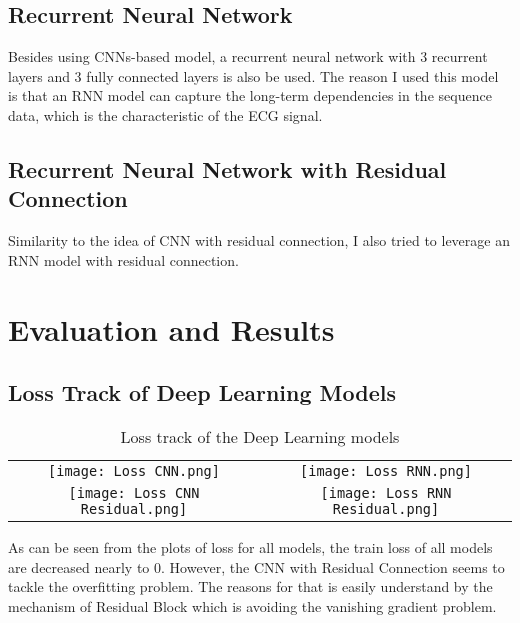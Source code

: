\documentclass{article}
\begin{document}
\subsection{Recurrent Neural Network}
Besides using CNNs-based model, a recurrent neural network with 3 recurrent layers and 3 fully connected layers
is also be used. The reason I used this model is that an RNN model can capture the long-term dependencies in the 
sequence data, which is the characteristic of the ECG signal. 

\subsection{Recurrent Neural Network with Residual Connection}
Similarity to the idea of CNN with residual connection, 
I also tried to leverage an RNN model with residual connection.

\section{Evaluation and Results}

\subsection{Loss Track of Deep Learning Models}
\begin{table}[h]
\centering
\begin{tabular}{cc}
\texttt{[image: Loss CNN.png]} & \texttt{[image: Loss RNN.png]} \\
\texttt{[image: Loss CNN Residual.png]} & \texttt{[image: Loss RNN Residual.png]} \\    
\end{tabular}
\caption{Loss track of the Deep Learning models}
\end{table}
As can be seen from the plots of loss for all models, the train loss of all models are decreased nearly to 0.
However, the CNN with Residual Connection seems to tackle the overfitting problem.
The reasons for that is easily understand by the mechanism of Residual Block which is avoiding the vanishing gradient problem.
\end{document}
